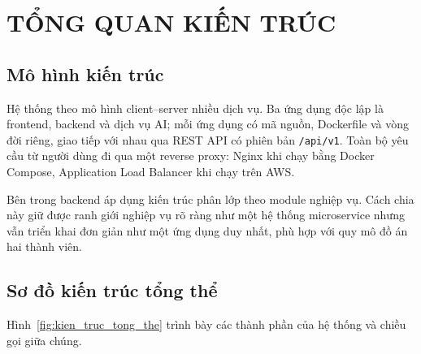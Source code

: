 \section{TỔNG QUAN KIẾN TRÚC}\label{sec:tong_quan_kien_truc}

\subsection{Mô hình kiến trúc}

Hệ thống theo mô hình client--server nhiều dịch vụ. Ba ứng dụng độc lập là frontend, backend và dịch vụ AI; mỗi ứng dụng có mã nguồn, Dockerfile và vòng đời riêng, giao tiếp với nhau qua REST API có phiên bản \texttt{/api/v1}. Toàn bộ yêu cầu từ người dùng đi qua một reverse proxy: Nginx khi chạy bằng Docker Compose, Application Load Balancer khi chạy trên AWS.

Bên trong backend áp dụng kiến trúc phân lớp theo module nghiệp vụ. Cách chia này giữ được ranh giới nghiệp vụ rõ ràng như một hệ thống microservice nhưng vẫn triển khai đơn giản như một ứng dụng duy nhất, phù hợp với quy mô đồ án hai thành viên.

\subsection{Sơ đồ kiến trúc tổng thể}

Hình~\ref{fig:kien_truc_tong_the} trình bày các thành phần của hệ thống và chiều gọi giữa chúng.

